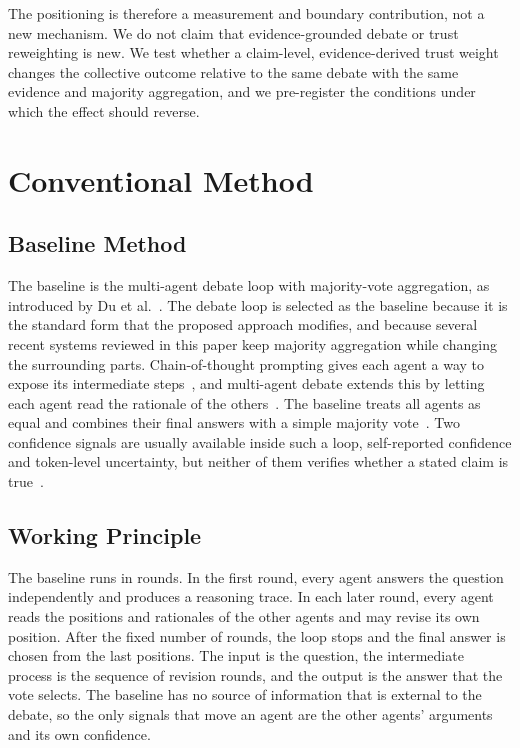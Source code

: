 \documentclass[a4paper,fleqn]{cas-sc}
\begin{document}
The positioning is therefore a measurement and boundary contribution, not a new mechanism. We do not claim that evidence-grounded debate or trust reweighting is new. We test whether a claim-level, evidence-derived trust weight changes the collective outcome relative to the same debate with the same evidence and majority aggregation, and we pre-register the conditions under which the effect should reverse.

\section{Conventional Method}\label{sec2}

\subsection{Baseline Method}

The baseline is the multi-agent debate loop with majority-vote aggregation, as introduced by Du et al.~\cite{du2024improving}. The debate loop is selected as the baseline because it is the standard form that the proposed approach modifies, and because several recent systems reviewed in this paper keep majority aggregation while changing the surrounding parts. Chain-of-thought prompting gives each agent a way to expose its intermediate steps~\cite{wei2022chain,zhang2025from}, and multi-agent debate extends this by letting each agent read the rationale of the others~\cite{du2024improving}. The baseline treats all agents as equal and combines their final answers with a simple majority vote~\cite{choi2025debate}. Two confidence signals are usually available inside such a loop, self-reported confidence and token-level uncertainty, but neither of them verifies whether a stated claim is true~\cite{yoffe-etal-2025-debunc}.

\subsection{Working Principle}

The baseline runs in rounds. In the first round, every agent answers the question independently and produces a reasoning trace. In each later round, every agent reads the positions and rationales of the other agents and may revise its own position. After the fixed number of rounds, the loop stops and the final answer is chosen from the last positions. The input is the question, the intermediate process is the sequence of revision rounds, and the output is the answer that the vote selects. The baseline has no source of information that is external to the debate, so the only signals that move an agent are the other agents' arguments and its own confidence.
\end{document}
